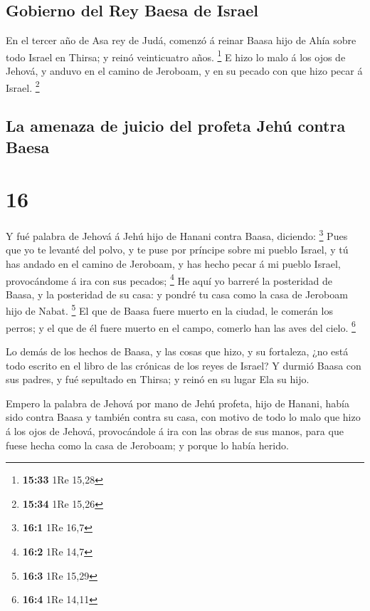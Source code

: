 \hypertarget{gobierno-del-rey-baesa-de-israel}{%
\subsection{Gobierno del Rey Baesa de
Israel}\label{gobierno-del-rey-baesa-de-israel}}

 En el tercer año de Asa rey de Judá, comenzó á reinar
Baasa hijo de Ahía sobre todo Israel en Thirsa; y reinó veinticuatro
años. \footnote{\textbf{15:33} 1Re 15,28}  E hizo lo malo
á los ojos de Jehová, y anduvo en el camino de Jeroboam, y en su pecado
con que hizo pecar á Israel. \footnote{\textbf{15:34} 1Re 15,26}

\hypertarget{la-amenaza-de-juicio-del-profeta-jehuxfa-contra-baesa}{%
\subsection{La amenaza de juicio del profeta Jehú contra
Baesa}\label{la-amenaza-de-juicio-del-profeta-jehuxfa-contra-baesa}}

\hypertarget{section-15}{%
\section{16}\label{section-15}}

 Y fué palabra de Jehová á Jehú hijo de Hanani contra
Baasa, diciendo: \footnote{\textbf{16:1} 1Re 16,7}  Pues
que yo te levanté del polvo, y te puse por príncipe sobre mi pueblo
Israel, y tú has andado en el camino de Jeroboam, y has hecho pecar á mi
pueblo Israel, provocándome á ira con sus pecados; \footnote{\textbf{16:2}
  1Re 14,7}  He aquí yo barreré la posteridad de Baasa, y
la posteridad de su casa: y pondré tu casa como la casa de Jeroboam hijo
de Nabat. \footnote{\textbf{16:3} 1Re 15,29}  El que de
Baasa fuere muerto en la ciudad, le comerán los perros; y el que de él
fuere muerto en el campo, comerlo han las aves del cielo. \footnote{\textbf{16:4}
  1Re 14,11}

 Lo demás de los hechos de Baasa, y las cosas que hizo, y
su fortaleza, ¿no está todo escrito en el libro de las crónicas de los
reyes de Israel?  Y durmió Baasa con sus padres, y fué
sepultado en Thirsa; y reinó en su lugar Ela su hijo.

 Empero la palabra de Jehová por mano de Jehú profeta,
hijo de Hanani, había sido contra Baasa y también contra su casa, con
motivo de todo lo malo que hizo á los ojos de Jehová, provocándole á ira
con las obras de sus manos, para que fuese hecha como la casa de
Jeroboam; y porque lo había herido.

